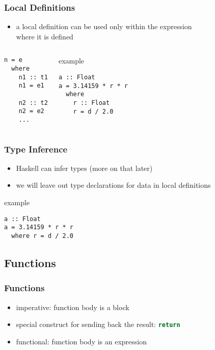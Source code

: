 \documentclass[dvipsnames]{beamer}
\theoremstyle{plain}
\begin{document}
\begin{frame}[fragile]
  \frametitle{Local Definitions}

  \begin{itemize}
    \item a \alert{local definition} can be used only within the expression\\
      where it is defined
  \end{itemize}

  \medskip
  \begin{columns}[b]
    \begin{lstlisting}
n = e
  where
    n1 :: t1
    n1 = e1

    n2 :: t2
    n2 = e2
    ...
    \end{lstlisting}

    \pause
    \begin{exampleblock}{example}
      \begin{lstlisting}
a :: Float
a = 3.14159 * r * r
  where
    r :: Float
    r = d / 2.0
      \end{lstlisting}
    \end{exampleblock}
  \end{columns}
\end{frame}

\begin{frame}[fragile]
  \frametitle{Type Inference}

  \begin{itemize}
    \item Haskell can infer types (more on that later)
    \item we will leave out type declarations for data in local definitions
  \end{itemize}

  \begin{exampleblock}{example}
    \begin{lstlisting}
a :: Float
a = 3.14159 * r * r
  where r = d / 2.0
    \end{lstlisting}
  \end{exampleblock}
\end{frame}

\subsection{Functions}

\begin{frame}
  \frametitle{Functions}

  \begin{itemize}
    \item imperative: function body is a block
    \item special construct for sending back the result:
      \lstinline[language=python]{return}

    \pause
    \bigskip
    \item functional: function body is an expression
  \end{itemize}
\end{frame}
\end{document}
